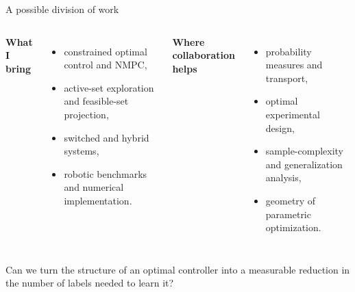 \documentclass[aspectratio=169,10pt]{beamer}
\begin{document}
\begin{frame}{A possible division of work}
\begin{columns}[T,onlytextwidth]
{\color{Teal}\Large\bfseries What I bring}

\begin{itemize}
  \item constrained optimal control and NMPC,
  \item active-set exploration and feasible-set projection,
  \item switched and hybrid systems,
  \item robotic benchmarks and numerical implementation.
\end{itemize}

{\color{Coral}\Large\bfseries Where collaboration helps}

\begin{itemize}
  \item probability measures and transport,
  \item optimal experimental design,
  \item sample-complexity and generalization analysis,
  \item geometry of parametric optimization.
\end{itemize}
\end{columns}

\vfill
\begin{center}
\colorbox{Ink}{\parbox{0.86\textwidth}{\centering\color{white}\large
Can we turn the structure of an optimal controller into a measurable reduction in the number of labels needed to learn it?}}
\end{center}
\end{frame}
\end{document}
